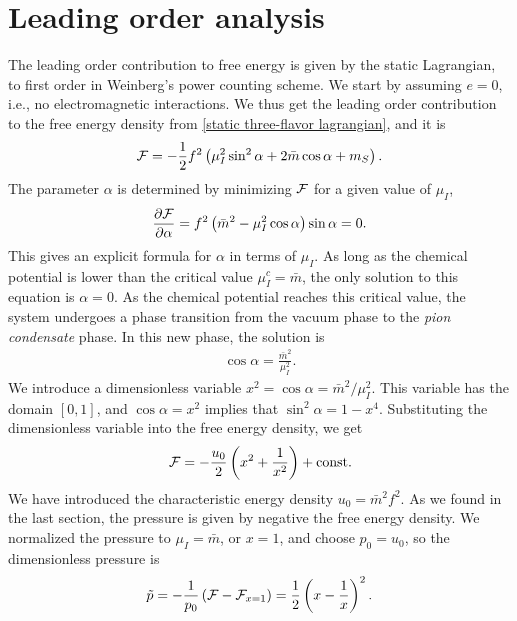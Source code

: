 \section{Leading order analysis}
\label{section: thermodynamics leading order}

The leading order contribution to free energy is given by the static Lagrangian, to first order in Weinberg's power counting scheme.
We start by assuming $e = 0$, i.e., no electromagnetic interactions.
We thus get the leading order contribution to the free energy density from \autoref{static three-flavor lagrangian}, and it is
%
\begin{equation}
    \mathcal{F} 
    = 
    - \frac{1}{2} f^2
    \left(
        \mu_I^2 \sin^2\alpha
        + 2\bar m \cos\alpha
        + m_S
    \right).
\end{equation}
%
The parameter $\alpha$ is determined by minimizing $\mathcal{F}$ for a given value of $\mu_I$,
%
\begin{equation}
    \pdv{\mathcal{F}}{\alpha} = f^2 \left(\bar m^2 - \mu_I^2 \cos \alpha\right) \sin\alpha = 0.
\end{equation}
%
This gives an explicit formula for $\alpha$ in terms of $\mu_I$.
As long as the chemical potential is lower than the critical value $\mu_I^c = \bar m$, the only solution to this equation is $\alpha = 0$.
As the chemical potential reaches this critical value, the system undergoes a phase transition from the vacuum phase to the \emph{pion condensate} phase.
In this new phase, the solution is
%
\begin{align}
    \label{alpha as function of mu lowest order}
    \cos \alpha = \frac{\bar m^2}{\mu_I^2}.
\end{align}
%
We introduce a dimensionless variable $x^2 = \cos\alpha = \bar m^2 / \mu_I^2$.
This variable has the domain $[0, 1]$, and $\cos \alpha = x^2$ implies that $\sin^2 \alpha = 1 - x^4$.
Substituting the dimensionless variable into the free energy density, we get 
%
\begin{equation}
    \mathcal{F} = - \frac{u_0}{2} \left( x^2 + \frac{1}{x^2} \right) +\mathrm{const.}
\end{equation}
%
We have introduced the characteristic energy density $u_0 = \bar m^2 f^2$.
As we found in the last section, the pressure is given by negative the free energy density. 
We normalized the pressure to $\mu_I = \bar m$, or $x = 1$, and choose $p_0 = u_0$, so the dimensionless pressure is
%
\begin{equation}
    \label{pressure leading order chpt}
    \tilde p = -\frac{1}{p_0} \left(\mathcal{F} - \mathcal{F}_{x=1}\right) 
    = \frac{1}{2} \left(x - \frac{1}{x}\right)^2.
\end{equation}

